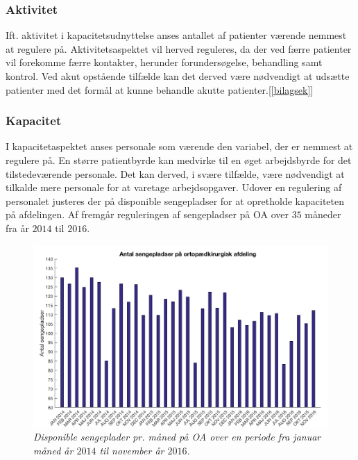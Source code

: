 \subsubsection{Aktivitet}
Ift. aktivitet i kapacitetsudnyttelse anses antallet af patienter værende nemmest at regulere på. Aktivitetsaspektet vil herved reguleres, da der ved færre patienter vil forekomme færre kontakter, herunder forundersøgelse, behandling samt kontrol. Ved akut opstående tilfælde kan det derved være nødvendigt at udsætte patienter med det formål at kunne behandle akutte patienter.[\ref{bilagsek}]


\subsubsection{Kapacitet}
I kapacitetaspektet anses personale som værende den variabel, der er nemmest at regulere på. En større patientbyrde kan medvirke til en øget arbejdsbyrde for det tilstedeværende personale. Det kan derved, i svære tilfælde, være nødvendigt at tilkalde mere personale for at varetage arbejdsopgaver. 
Udover en regulering af personalet justeres der på disponible sengepladser for at opretholde kapaciteten på afdelingen\cite{Bjerg2016}. Af  fremgår reguleringen af sengepladser på OA over $35$ måneder fra år $2014$ til $2016$.\cite{SDS2015}

\begin{figure}[H] 
\begin{center}
\includegraphics[width=1\textwidth]{figures/sengepladser}
\end{center}
\caption{\textit{Disponible sengeplader pr. måned på OA over en periode fra januar måned år $2014$ til november år $2016$.}\cite{SDS2015}} 
\label{fig:sengepladser} 
\end{figure}

